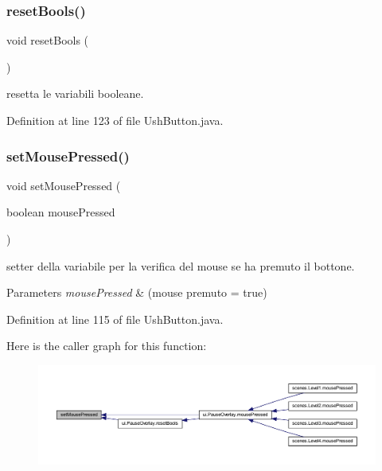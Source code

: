 \subsubsection{\texorpdfstring{reset\+Bools()}{resetBools()}}
{\footnotesize\ttfamily void reset\+Bools (\begin{DoxyParamCaption}{ }\end{DoxyParamCaption})}



resetta le variabili booleane. 



Definition at line 123 of file Ush\+Button.\+java.

\mbox{\label{classui_1_1_ush_button_ad6f3328519bbc954f7973bc885d088d8}} 
\subsubsection{\texorpdfstring{set\+Mouse\+Pressed()}{setMousePressed()}}
{\footnotesize\ttfamily void set\+Mouse\+Pressed (\begin{DoxyParamCaption}\item[{boolean}]{mouse\+Pressed }\end{DoxyParamCaption})}



setter della variabile per la verifica del mouse se ha premuto il bottone. 


\begin{DoxyParams}{Parameters}
{\em mouse\+Pressed} & (mouse premuto = true) \\
\hline
\end{DoxyParams}


Definition at line 115 of file Ush\+Button.\+java.

Here is the caller graph for this function\+:\nopagebreak
\begin{figure}[H]
\begin{center}
\leavevmode
\includegraphics[width=350pt]{classui_1_1_ush_button_ad6f3328519bbc954f7973bc885d088d8_icgraph}
\end{center}
\end{figure}
\mbox{\label{classui_1_1_ush_button_ac5c54df7ed3b930268c8d7752c101725}} 
